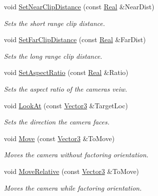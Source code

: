 \begin{DoxyCompactItemize}
void \hyperlink{classphys_1_1Camera_a0fdf28666baba46e907d6a8eac714915}{SetNearClipDistance} (const \hyperlink{namespacephys_af7eb897198d265b8e868f45240230d5f}{Real} \&NearDist)
\begin{DoxyCompactList}\small\item\em Sets the short range clip distance. \item\end{DoxyCompactList}\item 
void \hyperlink{classphys_1_1Camera_a77f0fa5cb6b934cfda8f5143afae3a0e}{SetFarClipDistance} (const \hyperlink{namespacephys_af7eb897198d265b8e868f45240230d5f}{Real} \&FarDist)
\begin{DoxyCompactList}\small\item\em Sets the long range clip distance. \item\end{DoxyCompactList}\item 
void \hyperlink{classphys_1_1Camera_a731d933c30bc95a83555412184d65cf8}{SetAspectRatio} (const \hyperlink{namespacephys_af7eb897198d265b8e868f45240230d5f}{Real} \&Ratio)
\begin{DoxyCompactList}\small\item\em Sets the aspect ratio of the cameras veiw. \item\end{DoxyCompactList}\item 
void \hyperlink{classphys_1_1Camera_a299de2281cc566df476b4684ac7d89fa}{LookAt} (const \hyperlink{classphys_1_1Vector3}{Vector3} \&TargetLoc)
\begin{DoxyCompactList}\small\item\em Sets the direction the camera faces. \item\end{DoxyCompactList}\item 
void \hyperlink{classphys_1_1Camera_a63cce67b42008ee8ce481b1ffd7fcbdf}{Move} (const \hyperlink{classphys_1_1Vector3}{Vector3} \&ToMove)
\begin{DoxyCompactList}\small\item\em Moves the camera without factoring orientation. \item\end{DoxyCompactList}\item 
void \hyperlink{classphys_1_1Camera_a34a5a7b76016042ce8b2278c35437486}{MoveRelative} (const \hyperlink{classphys_1_1Vector3}{Vector3} \&ToMove)
\begin{DoxyCompactList}\small\item\em Moves the camera while factoring orientation. \item\end{DoxyCompactList}\item 

\end{DoxyCompactItemize}
